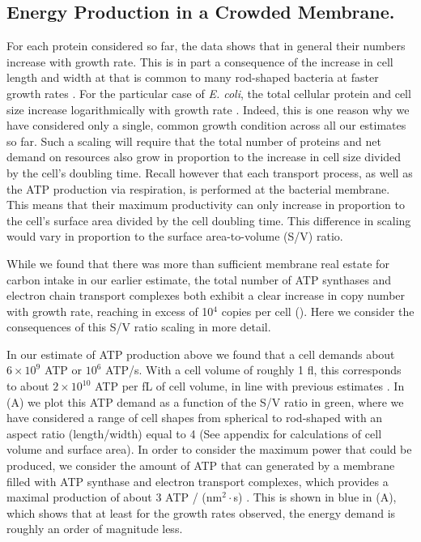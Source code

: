 \subsection{Energy Production in a Crowded Membrane.}

For each protein considered so far, the data shows that in general their numbers
increase with growth rate. This is in part a consequence of the increase in cell
length and width at that is common to many rod-shaped bacteria at faster growth
rates \citep{ojkic2019, harris2018}. For the particular case of \textit{E.
coli}, the total cellular protein and cell size increase logarithmically with
growth rate \citep{schaechter1958, si2017}. Indeed, this is one reason why we
have considered only a single, common growth condition across all our estimates
so far. Such a scaling will require that the total number of proteins and net
demand on resources also grow in proportion to the increase in cell size divided
by the cell's doubling time. Recall however that each transport process, as well
as the ATP production via respiration, is performed at the bacterial membrane.
This means that their maximum productivity can only increase in proportion to
the cell's surface area divided by the cell doubling time. This difference in
scaling would vary in proportion to the surface area-to-volume (S/V) ratio.

While we found that there was more than sufficient membrane real estate for
carbon intake in our earlier estimate, the total number of ATP synthases and
electron chain transport complexes both exhibit a clear increase in copy number
with growth rate, reaching in excess of 10$^4$ copies per cell
(). Here we consider the consequences of this
S/V ratio scaling in more detail.

In our estimate of ATP production above we found that a cell demands about
$6 \times 10^9$ ATP or $10^6$ ATP/s. With a cell volume of roughly 1 fl, this
corresponds to about $2 \times 10^{10}$ ATP per fL of cell volume, in line  with
previous estimates \citep{stouthamer1977, szenk2017}. In  (A)
we plot this ATP demand as a function of the S/V ratio in green, where we have
considered a range of cell shapes from spherical to rod-shaped with an aspect
ratio (length/width) equal to 4 (See appendix for calculations of cell volume
and surface area).  In order to consider the maximum power that could be
produced, we consider the amount of ATP that can generated by a membrane filled
with ATP synthase and electron transport complexes, which provides a maximal
production of about 3 ATP / (nm$^2 \cdot$s) \citep{szenk2017}. This is shown in
blue in (A), which shows that at least for the growth rates
observed, the energy demand is roughly an order of magnitude less.  

